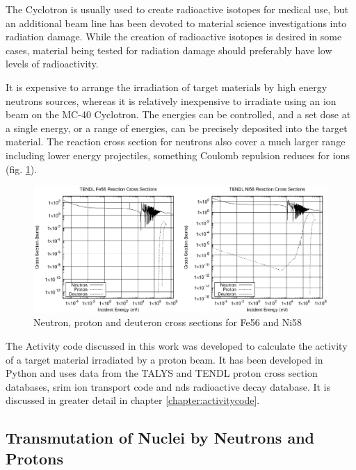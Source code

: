 The Cyclotron is usually used to create radioactive isotopes for medical use, but an additional beam line has been devoted to material science investigations into radiation damage.  While the creation of radioactive isotopes is desired in some cases, material being tested for radiation damage should preferably have low levels of radioactivity.

It is expensive to arrange the irradiation of target materials by high energy neutrons sources, whereas it is relatively inexpensive to irradiate using an ion beam on the MC-40 Cyclotron.  The energies can be controlled, and a set dose at a single energy, or a range of energies, can be precisely deposited into the target material.  The reaction cross section for neutrons also cover a much larger range including lower energy projectiles, something Coulomb repulsion reduces for ions (fig. \ref{fig:fe56ni58xs}).

\begin{figure}[tbp]
  \begin{center}
    \includegraphics[width=.7\linewidth]{chapters/isotope_activation_and_radioactive_decay/plots/npd_xs/fe56_ni58_xs.eps}
    \caption{Neutron, proton and deuteron cross sections for Fe56 and Ni58}
    \label{fig:fe56ni58xs}
  \end{center}
\end{figure}

The Activity code discussed in this work was developed to calculate the activity of a target material irradiated by a proton beam.  It has been developed in Python and uses data from the TALYS and TENDL proton cross section databases, \acrshort{srim} ion transport code and \acrlong{nds} radioactive decay database.  It is discussed in greater detail in chapter \ref{chapter:activitycode}. 


\FloatBarrier




\subsection{Transmutation of Nuclei by Neutrons and Protons}

